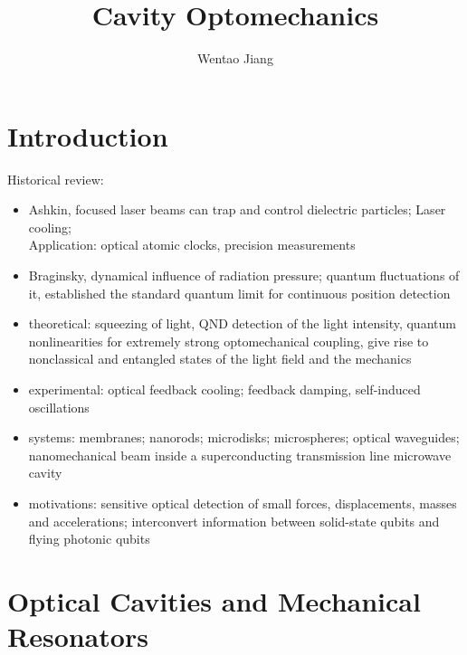 \documentclass[8pt,a4paper,twocolumn]{article} %
\numberwithin{equation}{section} %
\begin{document}
\small
	\title{Cavity Optomechanics}
	\author{Wentao Jiang}
	\date{}
	\maketitle
	\tableofcontents

	\section{Introduction} %
	\label{sec:introduction}
		Historical review:
		\begin{itemize}
    \setlength{\itemsep}{0.5pt}
    \setlength{\parsep}{0.5pt}
    \setlength{\parskip}{0.5pt}
			\item Ashkin, focused laser beams can trap and control dielectric particles; Laser cooling; \\
			Application: optical atomic clocks, precision measurements
			\item Braginsky, dynamical influence of radiation pressure; quantum fluctuations of it, established the standard quantum limit for continuous position detection
			\item theoretical: squeezing of light, QND detection of the light intensity, quantum nonlinearities for extremely strong optomechanical coupling, give rise to nonclassical and entangled states of the light field and the mechanics
			\item experimental: optical feedback cooling; feedback damping, self-induced oscillations
			\item systems: membranes; nanorods; microdisks; microspheres; optical waveguides; nanomechanical beam inside a superconducting transmission line microwave cavity
			\item motivations: sensitive optical detection of small forces, displacements, masses and accelerations; interconvert information between solid-state qubits and flying photonic qubits
		\end{itemize}

	\section{Optical Cavities and Mechanical Resonators} %
	\label{sec:optical_cavities_and_mechanical_resonators}
\end{document}
